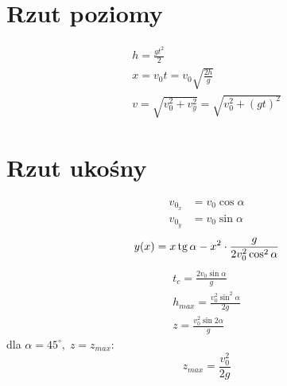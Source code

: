   \section{Rzut poziomy}
    \begin{gather}
      h = \frac{gt^2}{2}\\
      x = v_0t = v_0\sqrt{\frac{2h}{g}}\\
      v = \sqrt{v_0^2 + v_y^2} = \sqrt{v_0^2 + (gt)^2}
    \end{gather}
  \section{Rzut ukośny}
    \begin{align}
      v_{0_x} &= v_0\cos\alpha\\
      v_{0_y} &= v_0\sin\alpha
    \end{align}
    \begin{equation}
      y(x) = x\operatorname{tg}\alpha - x^2\cdot \frac{g}{2v_0^2\cos^2\alpha}
    \end{equation}
    \begin{gather}
      t_c = \frac{2v_0\sin\alpha}{g}\\
      h_{max} = \frac{v_0^2\sin^2\alpha}{2g}\\
      z = \frac{v_0^2\sin 2\alpha}{g}
    \end{gather}
    dla $\alpha = 45^\circ,\; z = z_{max}$:
    \begin{equation}
      z_{max} = \frac{v_0^2}{2g}
    \end{equation}
